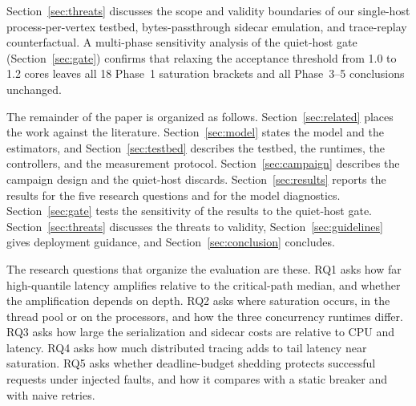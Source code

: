 Section~\ref{sec:threats} discusses the scope and validity boundaries of our single-host process-per-vertex testbed, bytes-passthrough sidecar emulation, and trace-replay counterfactual. A multi-phase sensitivity analysis of the quiet-host gate (Section~\ref{sec:gate}) confirms that relaxing the acceptance threshold from 1.0 to 1.2 cores leaves all 18 Phase~1 saturation brackets and all Phase~3--5 conclusions unchanged.

The remainder of the paper is organized as follows. Section~\ref{sec:related} places the work against the literature. Section~\ref{sec:model} states the model and the estimators, and Section~\ref{sec:testbed} describes the testbed, the runtimes, the controllers, and the measurement protocol. Section~\ref{sec:campaign} describes the campaign design and the quiet-host discards. Section~\ref{sec:results} reports the results for the five research questions and for the model diagnostics. Section~\ref{sec:gate} tests the sensitivity of the results to the quiet-host gate. Section~\ref{sec:threats} discusses the threats to validity, Section~\ref{sec:guidelines} gives deployment guidance, and Section~\ref{sec:conclusion} concludes.

The research questions that organize the evaluation are these. RQ1 asks how far high-quantile latency amplifies relative to the critical-path median, and whether the amplification depends on depth. RQ2 asks where saturation occurs, in the thread pool or on the processors, and how the three concurrency runtimes differ. RQ3 asks how large the serialization and sidecar costs are relative to CPU and latency. RQ4 asks how much distributed tracing adds to tail latency near saturation. RQ5 asks whether deadline-budget shedding protects successful requests under injected faults, and how it compares with a static breaker and with naive retries.
